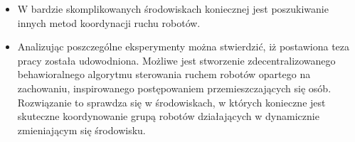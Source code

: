 \begin{frame}
{\begin{itemize}
	\item W bardzie skomplikowanych środowiskach koniecznej jest poszukiwanie innych metod koordynacji ruchu robotów.
	
	\item Analizując poszczególne eksperymenty można stwierdzić, iż postawiona teza pracy została udowodniona. Możliwe jest stworzenie zdecentralizowanego behawioralnego algorytmu sterowania ruchem robotów opartego na zachowaniu, inspirowanego postępowaniem przemieszczających się osób. Rozwiązanie to sprawdza się w środowiskach, w których konieczne jest skuteczne koordynowanie grupą robotów działających w dynamicznie zmieniającym się środowisku.
	
\end{itemize}	
}
\end{frame}
	


%
%
%	

